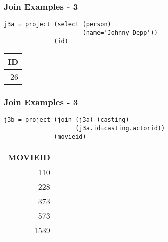 \documentclass[dvipsnames]{beamer}
\theoremstyle{plain}
\begin{document}
\begin{frame}[fragile]
  \frametitle{Join Examples - 3}

  \begin{example}
    \begin{lstlisting}
j3a = project (select (person)
                      (name='Johnny Depp'))
              (id)
    \end{lstlisting}

    \pause
    \begin{tiny}
    \begin{table}
      \begin{tabular}{|r|}\hline
ID\\\hline\hline
26\\\hline
      \end{tabular}
    \end{table}
    \end{tiny}
  \end{example}
\end{frame}

\begin{frame}[fragile]
  \frametitle{Join Examples - 3}

  \begin{example}
    \begin{lstlisting}
j3b = project (join (j3a) (casting)
                    (j3a.id=casting.actorid))
              (movieid)
    \end{lstlisting}

    \pause
    \begin{tiny}
    \begin{table}
      \begin{tabular}{|r|}\hline
MOVIEID\\\hline\hline
    110\\\hline
    228\\\hline
    373\\\hline
    573\\\hline
   1539\\\hline
      \end{tabular}
    \end{table}
    \end{tiny}
  \end{example}
\end{frame}
\end{document}
